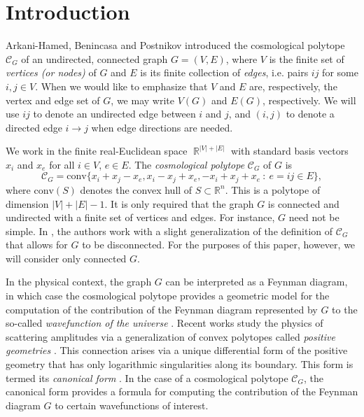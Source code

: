 \documentclass[11pt]{article}
\theoremstyle{definition}
\numberwithin{equation}{section}
\DeclareMathOperator{\RR}{\mathbb{R}}
\begin{document}
\section{Introduction}
\label{sec: intro}

Arkani-Hamed, Benincasa and Postnikov \cite{arkani2017cosmological} introduced the cosmological polytope $\mathcal{C}_G$ of an undirected, connected graph $G = (V,E)$, where $V$ is the finite set of \emph{vertices (or nodes)} of $G$ and $E$ is its finite collection of \emph{edges}, i.e. pairs $ij$ for some $i,j\in V$.
When we would like to emphasize that $V$ and $E$ are, respectively, the vertex and edge set of $G$, we may write $V(G)$ and $E(G)$, respectively. 
We will use $ij$ to denote an undirected edge between $i$ and $j$, and $(i,j)$ to denote a directed edge $i\rightarrow j$ when edge directions are needed.

We work in the finite real-Euclidean space $\RR^{|V|+|E|}$ with standard basis vectors $x_i$ and $x_e$ for all $i\in V$, $e\in E$. 
The \emph{cosmological polytope} $\mathcal{C}_G$ of $G$ is 
\[
        \mathcal{C}_G=\text{conv}\{x_i+x_j-x_e,x_i-x_j+x_e,-x_i+x_j+x_e ~:~ e = ij\in E\},
\]
where $\text{conv}(S)$ denotes the convex hull of $S\subset \mathbb{R}^n$.  
This is a polytope of dimension $|V| + |E| - 1$. 
It is only required that the graph $G$ is connected and undirected with a finite set of vertices and edges. 
For instance, $G$ need not be simple. 
In \cite{kuhne2022faces}, the authors work with a slight generalization of the definition of $\mathcal{C}_G$ that allows for $G$ to be disconnected. 
For the purposes of this paper, however, we will consider only connected $G$. 
 

In the physical context, the graph $G$ can be interpreted as a Feynman diagram, in which case the cosmological polytope provides a geometric model for the computation of the contribution of the Feynman diagram represented by $G$ to the so-called \emph{wavefunction of the universe} \cite{arkani2017cosmological}. 
Recent works study the physics of scattering amplitudes via a generalization of convex polytopes called \emph{positive geometries} \cite{arkani2017positive}. 
This connection arises via a unique differential form of the positive geometry that has only logarithmic singularities along its boundary. 
This form is termed its \emph{canonical form} \cite{arkani2017positive}.
In the case of a cosmological polytope $\mathcal{C}_G$, the canonical form provides a formula for computing the contribution of the Feynman diagram $G$ to certain wavefunctions of interest. 
\end{document}
